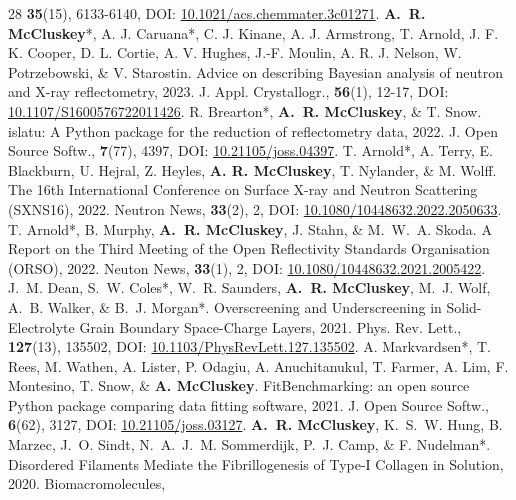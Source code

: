 \begin{paperenumerate}{28}
    {\textbf{35}(15), 6133-6140,}
    {DOI: \href{https://doi.org/10.1021/acs.chemmater.3c01271}{10.1021/acs.chemmater.3c01271}.}
  \cvpaper
    {\textbf{A.~R. McCluskey}*, A. J. Caruana*, C. J. Kinane, A. J. Armstrong, T. Arnold, J. F. K. Cooper, D. L. Cortie, A. V. Hughes, J.-F. Moulin, A. R. J. Nelson, W. Potrzebowski, \& V. Starostin.}
    {Advice on describing Bayesian analysis of neutron and X-ray reflectometry,}
    {2023.}
    {J. Appl. Crystallogr.,}
    {\textbf{56}(1), 12-17,}
    {DOI: \href{https://doi.org/10.1107/S1600576722011426}{10.1107/S1600576722011426}.}
  \cvpaper
    {R. Brearton*, \textbf{A.~R. McCluskey}, \& T. Snow.}
    {islatu: A Python package for the reduction of reflectometry data,}
    {2022.}
    {J. Open Source Softw.,}
    {\textbf{7}(77), 4397,}
    {DOI: \href{https://doi.org/10.21105/joss.04397}{10.21105/joss.04397}.}
  \cvpaper
    {T. Arnold*, A. Terry, E. Blackburn, U. Hejral, Z. Heyles, \textbf{A. R. McCluskey}, T. Nylander, \& M. Wolff.}
    {The 16th International Conference on Surface X-ray and Neutron Scattering (SXNS16),}
    {2022.}
    {Neutron News,}
    {\textbf{33}(2), 2,}
    {DOI: \href{https://doi.org/10.1080/10448632.2022.2050633}{10.1080/10448632.2022.2050633}.}
  \cvpaper
    {T. Arnold*, B. Murphy, \textbf{A.~R. McCluskey}, J. Stahn, \& M.~W.~A. Skoda.}
    {A Report on the Third Meeting of the Open Reflectivity Standards Organisation (ORSO),}
    {2022.}
    {Neuton News,}
    {\textbf{33}(1), 2,}
    {DOI: \href{https://doi.org/10.1080/10448632.2021.2005422}{10.1080/10448632.2021.2005422}.}
  \cvpaper
    {J.~M. Dean, S.~W. Coles*, W.~R. Saunders, \textbf{A.~R. McCluskey}, M.~J. Wolf, A.~B. Walker, \& B.~J. Morgan*.}
    {Overscreening and Underscreening in Solid-Electrolyte Grain Boundary Space-Charge Layers,}
    {2021.}
    {Phys. Rev. Lett.,}
    {\textbf{127}(13), 135502,}
    {DOI: \href{https://doi.org/10.1103/PhysRevLett.127.135502}{10.1103/PhysRevLett.127.135502}.}
  \cvpaper
    {A. Markvardsen*, T. Rees, M. Wathen, A. Lister, P. Odagiu, A. Anuchitanukul, T. Farmer, A. Lim, F. Montesino, T. Snow, \& \textbf{A. McCluskey}.}
    {FitBenchmarking: an open source Python package comparing data fitting software,}
    {2021.}
    {J. Open Source Softw.,}
    {\textbf{6}(62), 3127,}
    {DOI: \href{https://doi.org/10.21105/joss.03127}{10.21105/joss.03127}.}
  \cvpaper
    {\textbf{A.~R. McCluskey}, K.~S.~W. Hung, B. Marzec, J.~O. Sindt, N.~A.~J.~M. Sommerdijk, P.~J. Camp, \& F. Nudelman*.}
    {Disordered Filaments Mediate the Fibrillogenesis of Type-I Collagen in Solution,}
    {2020.}
    {Biomacromolecules,}

\end{paperenumerate}
